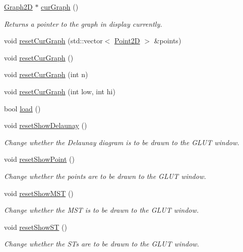 \begin{DoxyCompactItemize}
\item 
\hyperlink{classcmst_1_1_graph2_d}{Graph2D} $\ast$ \hyperlink{classcmst_1_1_window_a83548b1c4406f37a812a0920fc4d6669}{curGraph} ()
\begin{DoxyCompactList}\small\item\em Returns a pointer to the graph in display currently. \end{DoxyCompactList}\item 
void \hyperlink{classcmst_1_1_window_adfa83ea52f2c09def65b79cdf57092ad}{resetCurGraph} (std::vector$<$ \hyperlink{classcmst_1_1_point2_d}{Point2D} $>$ \&points)
\item 
void \hyperlink{classcmst_1_1_window_a08365866ac2ffa9793c25c92750341e2}{resetCurGraph} ()
\item 
void \hyperlink{classcmst_1_1_window_a83743944c1c6429f0eb9f3c72c9b7f22}{resetCurGraph} (int n)
\item 
void \hyperlink{classcmst_1_1_window_aa4ad17303edd88d526b66f9e6918fe7a}{resetCurGraph} (int low, int hi)
\item 
bool \hyperlink{classcmst_1_1_window_a3bb28914f7c58f3df9860ce333a8f25f}{load} ()
\item 
void \hyperlink{classcmst_1_1_window_ae54c419d28bd352f52a3beffa6fc1f32}{resetShowDelaunay} ()
\begin{DoxyCompactList}\small\item\em Change whether the Delaunay diagram is to be drawn to the GLUT window. \end{DoxyCompactList}\item 
void \hyperlink{classcmst_1_1_window_ade2fbcf37118ec96f9833112c0369d59}{resetShowPoint} ()
\begin{DoxyCompactList}\small\item\em Change whether the points are to be drawn to the GLUT window. \end{DoxyCompactList}\item 
void \hyperlink{classcmst_1_1_window_aad255fb6e9d56a48f85f9618aa99bc59}{resetShowMST} ()
\begin{DoxyCompactList}\small\item\em Change whether the MST is to be drawn to the GLUT window. \end{DoxyCompactList}\item 
void \hyperlink{classcmst_1_1_window_aceb66dae5cf798bf9df5f1f5deca520b}{resetShowST} ()
\begin{DoxyCompactList}\small\item\em Change whether the STs are to be drawn to the GLUT window. \end{DoxyCompactList}\item 

\end{DoxyCompactItemize}
